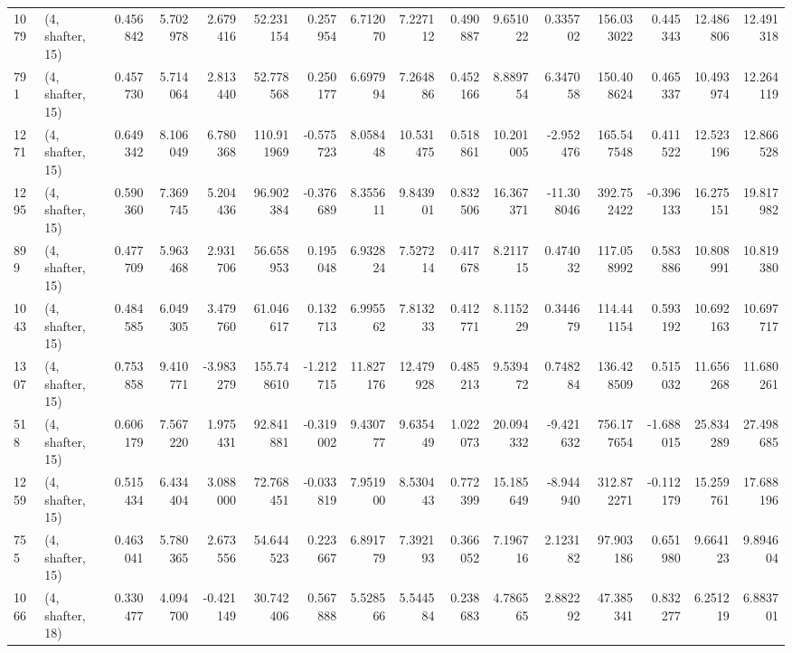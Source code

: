 \begin{tabular}{llrrrrrrrrrrrrrr}
1079 &  (4, shafter, 15) &   0.456842 &   5.702978 &   2.679416 &     52.231154 &    0.257954 &    6.712070 &    7.227112 &  0.490887 &   9.651022 &   0.335702 &   156.033022 &   0.445343 &  12.486806 &  12.491318 \\
791  &  (4, shafter, 15) &   0.457730 &   5.714064 &   2.813440 &     52.778568 &    0.250177 &    6.697994 &    7.264886 &  0.452166 &   8.889754 &   6.347058 &   150.408624 &   0.465337 &  10.493974 &  12.264119 \\
1271 &  (4, shafter, 15) &   0.649342 &   8.106049 &   6.780368 &    110.911969 &   -0.575723 &    8.058448 &   10.531475 &  0.518861 &  10.201005 &  -2.952476 &   165.547548 &   0.411522 &  12.523196 &  12.866528 \\
1295 &  (4, shafter, 15) &   0.590360 &   7.369745 &   5.204436 &     96.902384 &   -0.376689 &    8.355611 &    9.843901 &  0.832506 &  16.367371 & -11.308046 &   392.752422 &  -0.396133 &  16.275151 &  19.817982 \\
899  &  (4, shafter, 15) &   0.477709 &   5.963468 &   2.931706 &     56.658953 &    0.195048 &    6.932824 &    7.527214 &  0.417678 &   8.211715 &   0.474032 &   117.058992 &   0.583886 &  10.808991 &  10.819380 \\
1043 &  (4, shafter, 15) &   0.484585 &   6.049305 &   3.479760 &     61.046617 &    0.132713 &    6.995562 &    7.813233 &  0.412771 &   8.115229 &   0.344679 &   114.441154 &   0.593192 &  10.692163 &  10.697717 \\
1307 &  (4, shafter, 15) &   0.753858 &   9.410771 &  -3.983279 &    155.748610 &   -1.212715 &   11.827176 &   12.479928 &  0.485213 &   9.539472 &   0.748284 &   136.428509 &   0.515032 &  11.656268 &  11.680261 \\
518  &  (4, shafter, 15) &   0.606179 &   7.567220 &   1.975431 &     92.841881 &   -0.319002 &    9.430777 &    9.635449 &  1.022073 &  20.094332 &  -9.421632 &   756.177654 &  -1.688015 &  25.834289 &  27.498685 \\
1259 &  (4, shafter, 15) &   0.515434 &   6.434404 &   3.088000 &     72.768451 &   -0.033819 &    7.951900 &    8.530443 &  0.772399 &  15.185649 &  -8.944940 &   312.872271 &  -0.112179 &  15.259761 &  17.688196 \\
755  &  (4, shafter, 15) &   0.463041 &   5.780365 &   2.673556 &     54.644523 &    0.223667 &    6.891779 &    7.392193 &  0.366052 &   7.196716 &   2.123182 &    97.903186 &   0.651980 &   9.664123 &   9.894604 \\
1066 &  (4, shafter, 18) &   0.330477 &   4.094700 &  -0.421149 &     30.742406 &    0.567888 &    5.528566 &    5.544584 &  0.238683 &   4.786565 &   2.882292 &    47.385341 &   0.832277 &   6.251219 &   6.883701 \\

\end{tabular}
